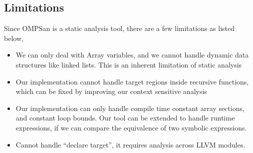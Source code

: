 \subsection{Limitations}
\label{limitation}
Since OMPSan is a static analysis tool, there are a few limitations
as listed below,  
\vspace{-2pt}
\begin{itemize}
 \item We can only deal with Array variables, and we cannot 
 handle dynamic data structures like linked lists. This is an 
 inherent limitation of static analysis
 \item Our implementation cannot handle target regions inside recursive functions, which
 can be fixed by improving our context sensitive analysis 
 \item Our implementation can only handle compile time 
 constant array sections, and constant loop bounds. Our 
 tool can be extended to handle runtime expressions, if 
 we can compare the equivalence of two symbolic expressions.
 \item Cannot handle ``declare target'', it requires
 analysis across LLVM modules.
\end{itemize}
% 
% 
% 
